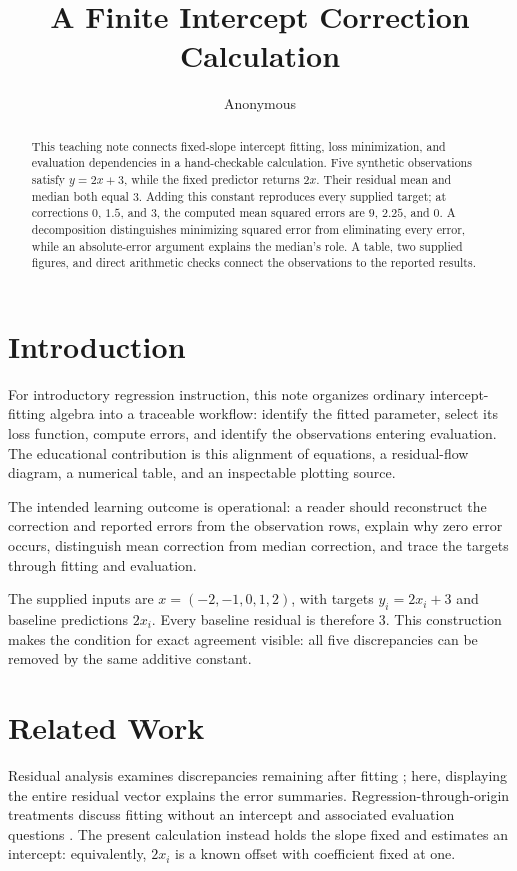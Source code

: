 \documentclass[11pt]{article}
\title{A Finite Intercept Correction Calculation}
\author{Anonymous}
\date{}
\begin{document}
\maketitle

\begin{abstract}
This teaching note connects fixed-slope intercept fitting, loss minimization, and evaluation dependencies in a hand-checkable calculation. Five synthetic observations satisfy $y=2x+3$, while the fixed predictor returns $2x$. Their residual mean and median both equal $3$. Adding this constant reproduces every supplied target; at corrections $0$, $1.5$, and $3$, the computed mean squared errors are $9$, $2.25$, and $0$. A decomposition distinguishes minimizing squared error from eliminating every error, while an absolute-error argument explains the median's role. A table, two supplied figures, and direct arithmetic checks connect the observations to the reported results.
\end{abstract}

\section{Introduction}

For introductory regression instruction, this note organizes ordinary intercept-fitting algebra into a traceable workflow: identify the fitted parameter, select its loss function, compute errors, and identify the observations entering evaluation. The educational contribution is this alignment of equations, a residual-flow diagram, a numerical table, and an inspectable plotting source.

The intended learning outcome is operational: a reader should reconstruct the correction and reported errors from the observation rows, explain why zero error occurs, distinguish mean correction from median correction, and trace the targets through fitting and evaluation.

The supplied inputs are $x=(-2,-1,0,1,2)$, with targets $y_i=2x_i+3$ and baseline predictions $2x_i$. Every baseline residual is therefore $3$. This construction makes the condition for exact agreement visible: all five discrepancies can be removed by the same additive constant.

\section{Related Work}

Residual analysis examines discrepancies remaining after fitting \cite{Anscombe1963ExaminationAnalysis}; here, displaying the entire residual vector explains the error summaries. Regression-through-origin treatments discuss fitting without an intercept and associated evaluation questions \cite{Eisenhauer2003RegressionThrough}. The present calculation instead holds the slope fixed and estimates an intercept: equivalently, $2x_i$ is a known offset with coefficient fixed at one.
\end{document}
